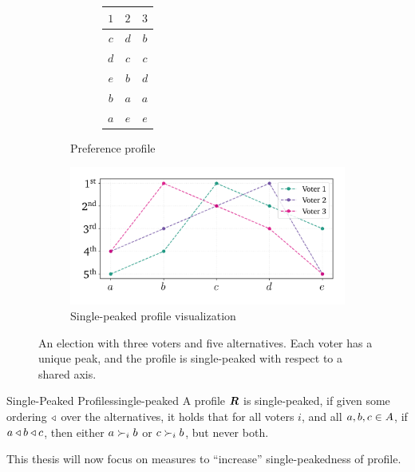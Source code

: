 \begin{figure}[ht]
	\centering
	\begin{subfigure}[b]{0.3\textwidth}
		\centering
		\begin{subfigure}[b]{0.3\textwidth}
			\centering
			\begin{tabular}{ccc}
				\toprule
				$1$ & $2$ & $3$ \\
				\midrule
				$c$ & $d$ & $b$ \\
				$d$ & $c$ & $c$ \\
				$e$ & $b$ & $d$ \\
				$b$ & $a$ & $a$ \\
				$a$ & $e$ & $e$ \\
				\bottomrule
			\end{tabular}
			\vspace{2.8em}
		\end{subfigure}
		\caption{Preference profile}\label{tab:corresponding_profile}
	\end{subfigure}
	\hfill
	\begin{subfigure}[b]{0.65\textwidth}
		\centering
		\includegraphics[width=\textwidth]{Figures/single_peak_vis.png}
		\caption{Single-peaked profile visualization}\label{fig:singlepeaked_vis}
	\end{subfigure}
	\caption{An election with three voters and five alternatives. Each voter has a unique peak, and the profile is single-peaked with respect to a shared axis.}
	\label{fig:singlepeaked_full}
\end{figure}
\begin{definition}{Single-Peaked Profiles}{single-peaked}
	A profile $\boldsymbol{R}$ is single-peaked, if given some ordering $\triangleleft$ over the alternatives, it holds that for all voters $i$, and all $a, b, c \in A$, if $a \triangleleft b \triangleleft c$, then either $a \succ_i b$ or $c \succ_i b$, but never both.
\end{definition}

This thesis will now focus on measures to ``increase'' single-peakedness of profile.



